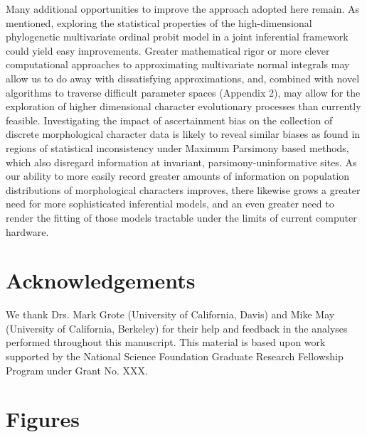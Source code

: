 \documentclass[10pt, twocolumn, twoside]{article}
\begin{document}
Many additional opportunities to improve the approach adopted here remain. As mentioned, exploring the statistical properties of the high-dimensional phylogenetic multivariate ordinal probit model in a joint inferential framework could yield easy improvements. Greater mathematical rigor or more clever computational approaches to approximating multivariate normal integrals may allow us to do away with dissatisfying approximations, and, combined with novel algorithms to traverse difficult parameter spaces (Appendix 2), may allow for the exploration of higher dimensional character evolutionary processes than currently feasible. Investigating the impact of ascertainment bias on the collection of discrete morphological character data is likely to reveal similar biases as found in regions of statistical inconsistency under Maximum Parsimony based methods, which also disregard information at invariant, parsimony-uninformative sites. As our ability to more easily record greater amounts of information on population distributions of morphological characters improves, there likewise grows a greater need for more sophisticated inferential models, and an even greater need to render the fitting of those models tractable under the limits of current computer hardware.

\clearpage

\section*{Acknowledgements}

We thank Drs. Mark Grote (University of California, Davis) and Mike May (University of California, Berkeley) for their help and feedback in the analyses performed throughout this manuscript. This material is based upon work supported by the National Science Foundation Graduate Research Fellowship Program under Grant No. XXX.

\clearpage
\onecolumn
\section{Figures}
\end{document}
